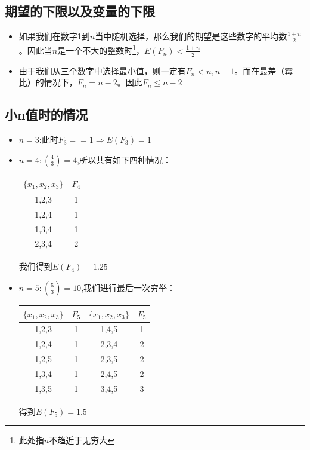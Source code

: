 \documentclass{ctexart}
\theoremstyle{definition}
\begin{document}
\subsection{期望的下限以及变量的下限}
\begin{itemize}
    \item 如果我们在数字1到$n$当中随机选择，那么我们的期望是这些数字的平均数$\frac{1+n}{2}$。因此当$n$是一个不大的整数时\footnote{此处指$n$不趋近于无穷大}，$E(F_n) < \frac{1+n}{2}$
    \item 由于我们从三个数字中选择最小值，则一定有$F_n < n,n-1$。而在最差（霉比）的情况下，$F_n=n-2$。因此$F_n \leq n-2$
\end{itemize}
\subsection{小n值时的情况}
\begin{itemize}
    \item $n=3$:此时$F_3==1 \Rightarrow E(F_3)=1$
    \item $n=4:\binom{4}{3}=4$,所以共有如下四种情况：
    \begin{center}
 \begin{tabular}{||c |c||} 
 \hline
 $\{x_1,x_2,x_3\}$ & $F_4$ \\ [0.5ex] 
 \hline\hline
 {1,2,3} & 1  \\ 
 \hline
 {1,2,4} & 1 \\
 \hline
 {1,3,4} & 1\\
 \hline
 {2,3,4} & 2 \\
 \hline
\end{tabular}
\end{center}
我们得到$E(F_4)=1.25$
\item $n=5: \binom{5}{3}=10$,我们进行最后一次穷举：
    \begin{center}
 \begin{tabular}{||c |c|| c | c ||} 
 \hline
 $\{x_1,x_2,x_3\}$ & $F_5$ & $\{x_1,x_2,x_3\}$ & $F_5$\\ [0.5ex] 
 \hline\hline
 {1,2,3} & 1 & {1,4,5} & 1\\ 
 \hline
 {1,2,4} & 1 & {2,3,4} & 2\\
 \hline
 {1,2,5} & 1 & {2,3,5} & 2\\
 \hline
 {1,3,4} & 1 & {2,4,5} & 2\\
 \hline
 {1,3,5} & 1 & {3,4,5} & 3\\
 \hline
\end{tabular}
\end{center}
得到$E(F_5)=1.5$
\end{itemize}
\end{document}
